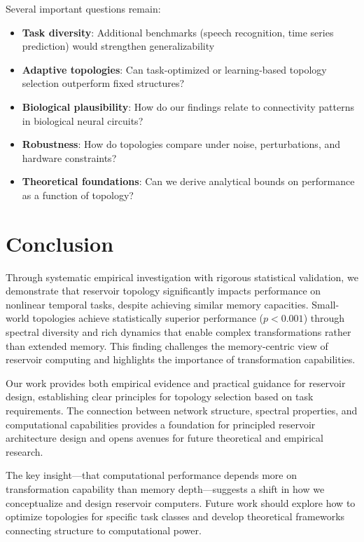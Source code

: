 \documentclass{article}
\begin{document}
Several important questions remain:

\begin{itemize}
\item \textbf{Task diversity}: Additional benchmarks (speech recognition, time series prediction) would strengthen generalizability
\item \textbf{Adaptive topologies}: Can task-optimized or learning-based topology selection outperform fixed structures?
\item \textbf{Biological plausibility}: How do our findings relate to connectivity patterns in biological neural circuits?
\item \textbf{Robustness}: How do topologies compare under noise, perturbations, and hardware constraints?
\item \textbf{Theoretical foundations}: Can we derive analytical bounds on performance as a function of topology?
\end{itemize}

\section{Conclusion}

Through systematic empirical investigation with rigorous statistical validation, we demonstrate that reservoir topology significantly impacts performance on nonlinear temporal tasks, despite achieving similar memory capacities. Small-world topologies achieve statistically superior performance ($p < 0.001$) through spectral diversity and rich dynamics that enable complex transformations rather than extended memory. This finding challenges the memory-centric view of reservoir computing and highlights the importance of transformation capabilities.

Our work provides both empirical evidence and practical guidance for reservoir design, establishing clear principles for topology selection based on task requirements. The connection between network structure, spectral properties, and computational capabilities provides a foundation for principled reservoir architecture design and opens avenues for future theoretical and empirical research.

The key insight—that computational performance depends more on transformation capability than memory depth—suggests a shift in how we conceptualize and design reservoir computers. Future work should explore how to optimize topologies for specific task classes and develop theoretical frameworks connecting structure to computational power.
\end{document}
